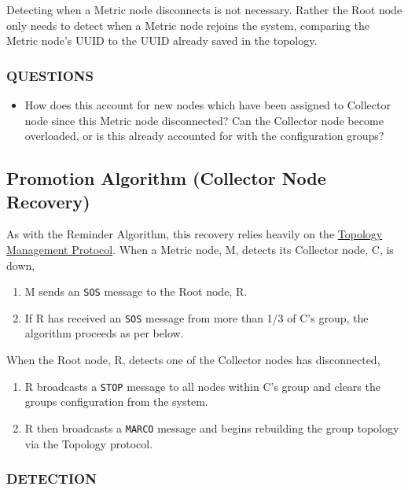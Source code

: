 Detecting when a Metric node disconnects is not necessary. Rather the Root node only needs to detect when a Metric node
rejoins the \dcamp system, comparing the Metric node's UUID to the UUID already saved in the topology.

\subsubsection{QUESTIONS}

\begin{itemize}
\item How does this account for new nodes which have been assigned to Collector node since this Metric node
      disconnected? Can the Collector node become overloaded, or is this already accounted for with the configuration
      groups?
\end{itemize}

\subsection{Promotion Algorithm (Collector Node Recovery)}
\label{algor_promo}

As with the Reminder Algorithm, this recovery relies heavily on the \hyperref[proto_topo]{Topology Management Protocol}.
When a Metric node, M, detects its Collector node, C, is down, 

\begin{enumerate}
\item M sends an \texttt{SOS} message to the Root node, R.
\item If R has received an \texttt{SOS} message from more than 1/3 of C's group, the algorithm proceeds as per below.
\end{enumerate}

When the Root node, R, detects one of the Collector nodes has disconnected,

\begin{enumerate}
\item R broadcasts a \texttt{STOP} message to all nodes within C's group and clears the groups configuration from the
      \dcamp system.
\item R then broadcasts a \texttt{MARCO} message and begins rebuilding the group topology via the Topology protocol.
\end{enumerate}

\subsubsection{DETECTION}

